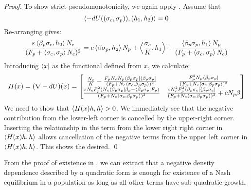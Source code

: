 \begin{proof}
  To show strict pseudomonotonicity, we again apply . Assume that
  \begin{equation}
    \left \langle -dU((\sigma_c,\sigma_p)),(h_1, h_2) \right \rangle = 0
  \end{equation}
  Re-arranging gives:
  \begin{equation}
    \label{eq:h1_h2_rel}
    \frac{\varepsilon \left \langle \beta_p \sigma_c,h_2 \right \rangle N_c}{(F_p + \left \langle \sigma_c,\sigma_p \right \rangle N_c)^2} = c\left \langle \beta \sigma_p,h_2 \right \rangle N_p + \left \langle \frac{\sigma_c}{K},h_1 \right \rangle + \frac{\left \langle \beta_p \sigma_p,h_1 \right \rangle N_p}{(F_p + \left \langle \sigma_c,\sigma_p \right \rangle N_c)}
  \end{equation}
  Introducing $\langle x \rvert$ as the functional defined from $x$, we calculate:
  \begin{equation}
    \label{eq:hess_mat}
    H(x) = (\nabla -dU)(x) =
    \begin{bmatrix}
      \frac{N_c}{K} - \frac{F_p N_c N_p \langle \beta_p \sigma_p \rvert \langle \beta_p \sigma_p \rvert}{(F_p + N_c \left \langle \sigma_c,\beta_p \sigma_p \right \rangle)^2} & \frac{F_p^2 N_p \langle \beta_p \sigma_p \rvert}{(F_p + N_c \left \langle \sigma_c,\beta_p \sigma_p \right \rangle)^2} \\
      \frac{\varepsilon N_cF_p^2 (N_c \langle \beta_p \sigma_p \rvert \beta_p - \langle \beta_p \sigma_p \rvert F_p)}{(F_p + N_c \left \langle \sigma_c,\beta_p \sigma_p \right \rangle)^3} & \frac{\varepsilon N_c^2 F_p^2 \langle \beta_p \sigma_c \rvert \langle \beta_p \sigma_c \rvert}{(F_p + N_c \left \langle \sigma_c,\beta_p \sigma_p \right \rangle)^3}+c N_p \beta
    \end{bmatrix}
  \end{equation}
  We need to show that $\left \langle H(x)h,h \right \rangle>0$. We immediately see that the negative contribution from the lower-left corner is cancelled by the upper-right corner. Inserting the relationship  in the term from the lower right right corner in $\left \langle H(x)h,h \right \rangle$ allows cancellation of the negative terms from the upper left corner in $\left \langle H(x)h,h \right \rangle$. This shows the desired. %
  \qed
\end{proof}
\begin{remark}
  From the proof of existence in , we can extract that a negative density dependence described by a quadratic form is enough for existence of a Nash equilibrium in a population as long as all other terms have sub-quadratic growth.
\end{remark}

